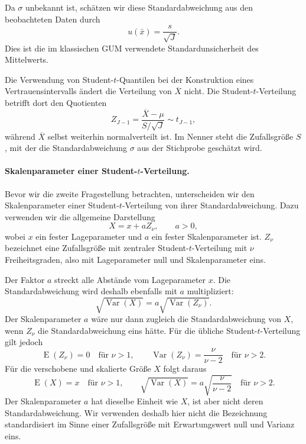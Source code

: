 Da $\sigma$ unbekannt ist, schätzen wir diese Standardabweichung
aus den beobachteten Daten durch
\begin{equation}
u(\bar x)=\frac{s}{\sqrt J}.
\end{equation}
Dies ist die im klassischen GUM verwendete Standardunsicherheit
des Mittelwerts.

Die Verwendung von Student-$t$-Quantilen bei der Konstruktion
eines Vertrauensintervalls ändert die Verteilung von $\overline X$
nicht. Die Student-$t$-Verteilung betrifft dort den Quotienten
\begin{equation}
Z_{J-1}
=
\frac{\overline X-\mu}{S/\sqrt J}
\sim t_{J-1},
\end{equation}
während $\overline X$ selbst weiterhin normalverteilt ist.
Im Nenner steht die Zufallsgröße $S$, mit der die
Standardabweichung $\sigma$ aus der Stichprobe geschätzt wird.

\paragraph{Skalenparameter einer Student-$t$-Verteilung.}

Bevor wir die zweite Fragestellung betrachten, unterscheiden
wir den Skalenparameter einer Student-$t$-Verteilung von
ihrer Standardabweichung. Dazu verwenden wir die allgemeine
Darstellung
\begin{equation}
X=x+aZ_\nu,
\qquad a>0,
\end{equation}
wobei $x$ ein fester Lageparameter und $a$ ein fester
Skalenparameter ist. $Z_\nu$ bezeichnet eine Zufallsgröße
mit zentraler Student-$t$-Verteilung mit $\nu$ Freiheitsgraden,
also mit Lageparameter null und Skalen\-para\-meter eins.

Der Faktor $a$ streckt alle Abstände vom Lageparameter $x$.
Die Standardabweichung wird deshalb ebenfalls mit $a$
multipliziert:
\begin{equation}
\sqrt{\operatorname{Var}(X)}
=
a\sqrt{\operatorname{Var}(Z_\nu)}.
\end{equation}
Der Skalenparameter $a$ wäre nur dann zugleich die
Standardabweichung von $X$, wenn $Z_\nu$ die Standardabweichung
eins hätte. Für die übliche Student-$t$-Verteilung gilt jedoch
\begin{equation}
\operatorname E(Z_\nu)=0
\quad\text{für }\nu>1,
\qquad
\operatorname{Var}(Z_\nu)=\frac{\nu}{\nu-2}
\quad\text{für }\nu>2.
\end{equation}
Für die verschobene und skalierte Größe $X$ folgt daraus
\begin{equation}
\operatorname E(X)=x
\quad\text{für }\nu>1,
\qquad
\sqrt{\operatorname{Var}(X)}
=
a\sqrt{\frac{\nu}{\nu-2}}
\quad\text{für }\nu>2.
\label{eq:tSkalaStandardabweichung10}
\end{equation}
Der Skalenparameter $a$ hat dieselbe Einheit wie $X$,
ist aber nicht deren Standardabweichung.
Wir verwenden deshalb hier nicht die Bezeichnung
\glqq standardisiert\grqq{} im Sinne einer Zufallsgröße
mit Erwartungswert null und Varianz eins.

